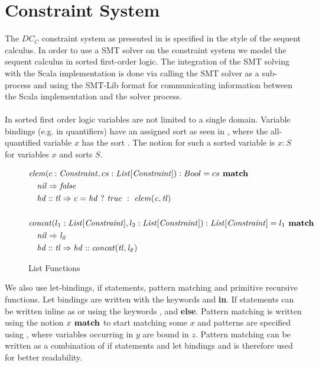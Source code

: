 \section{Constraint System}
\label{sec:constraintsystem}
The $DC_C$ constraint system as presented in 
is specified in the style of the sequent calculus.
In order to use a SMT solver on the constraint system
we model the sequent calculus in sorted first-order logic.
The integration of the SMT solving with the Scala implementation
is done via calling the SMT solver as a sub-process and using
the SMT-Lib format for communicating information between
the Scala implementation and the solver process.
\\ \\
In sorted first order logic variables are not limited to a single domain.
Variable bindings (e.g. in quantifiers)
have an assigned sort as seen in ,
where the all-quantified variable $x$ has the sort .
The notion for such a sorted variable is $x: S$
for variables $x$ and sorts $S$.
\begin{figure}[b]
\begin{align*}
&\mathit{elem}(c: \mathit{Constraint}, cs: \mathit{List[\mathit{Constraint}]}): Bool = cs \textbf{ match}\\
&\quad \mathit{\mathit{nil}} \Rightarrow \mathit{false}\\
&\quad \mathit{hd :: tl} \Rightarrow \mathit{c = hd\ ?\ true\ :\ \mathit{elem}(c, tl)}\\\\
&\mathit{concat}(l_1: \mathit{List[\mathit{Constraint}]}, l_2: \mathit{List[\mathit{Constraint}]}): \mathit{List[\mathit{Constraint}]} = l_1 \textbf{ match}\\
&\quad \mathit{\mathit{nil}} \Rightarrow \mathit{l_2}\\
&\quad \mathit{hd :: tl} \Rightarrow \mathit{hd :: \mathit{concat}(tl, l_2)}
\end{align*}
\caption{List Functions}
\label{fig:fo-list-funs}
\end{figure}
%
We also use let-bindings, if statements, pattern matching and primitive recursive functions.
Let bindings are written with the keywords \Let and \textbf{in}.
If statements can be written inline as  or using
the keywords \If, \Then and \textbf{else}.
Pattern matching is written using the notion $x \textbf{ match}$ to start matching some $x$
and patterns are specified using ,
where variables occurring in $y$ are bound in $z$.
Pattern matching can be written as a combination of if statements and let bindings
and is therefore used for better readability.


